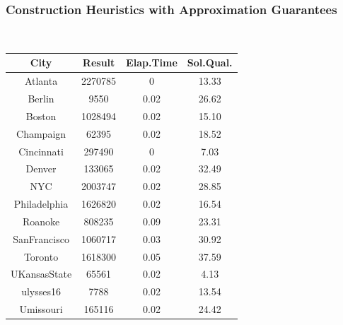 \begin{center}
\begin{tabular}{ |c|c|c|c|c| }
\end{tabular}
\end{center}

\subsubsection{Construction Heuristics with Approximation Guarantees}
\hfill\\
\begin{center}
\begin{tabular}{ |c|c|c|c| } 
\hline
City         & Result  & Elap.Time & Sol.Qual. \\
\hline
Atlanta      & 2270785 & 0         & 13.33     \\
Berlin       & 9550    & 0.02      & 26.62     \\
Boston       & 1028494 & 0.02      & 15.10     \\
Champaign    & 62395   & 0.02      & 18.52     \\
Cincinnati   & 297490  & 0         & 7.03      \\
Denver       & 133065  & 0.02      & 32.49     \\
NYC          & 2003747 & 0.02      & 28.85     \\
Philadelphia & 1626820 & 0.02      & 16.54     \\
Roanoke      & 808235  & 0.09      & 23.31     \\
SanFrancisco & 1060717 & 0.03      & 30.92     \\
Toronto      & 1618300 & 0.05      & 37.59     \\
UKansasState & 65561   & 0.02      & 4.13      \\
ulysses16    & 7788    & 0.02      & 13.54     \\
Umissouri    & 165116  & 0.02      & 24.42     \\
\hline
\end{tabular}
\end{center}


